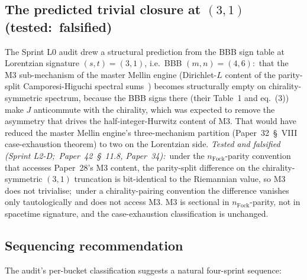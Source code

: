 \documentclass[twocolumn,pra,amsmath,amssymb,superscriptaddress]{revtex4-2}
\begin{document}
\subsection{The predicted trivial closure at $(3, 1)$ (tested:\ falsified)}
\label{sec:sig_trivial_closure}

The Sprint L0 audit drew a structural prediction from the BBB sign
table at Lorentzian signature $(s, t) = (3, 1)$, i.e.\ BBB
$(m, n) = (4, 6)$:\ that the M3 sub-mechanism of the master Mellin
engine (Dirichlet-$L$ content of the parity-split
Camporesi-Higuchi spectral sums~\cite{paper28}) becomes structurally
empty on chirality-symmetric spectrum, because the BBB signs there
(their Table~1 and eq.~(3)) make $J$ anticommute with the chirality,
which was expected to remove the asymmetry that drives the
half-integer-Hurwitz content of M3.  That would have reduced the master
Mellin engine's three-mechanism partition (Paper~32~\S~VIII
case-exhaustion theorem) to two on the Lorentzian side.  \emph{Tested
and falsified (Sprint L2-D;\ Paper~42~\S~11.8, Paper~34):}\ under the
$n_{\mathrm{Fock}}$-parity convention that accesses Paper~28's M3
content, the parity-split difference on the chirality-symmetric
$(3, 1)$ truncation is bit-identical to the Riemannian value, so M3
does not trivialise;\ under a chirality-pairing convention the
difference vanishes only tautologically and does not access M3.  M3 is
sectional in $n_{\mathrm{Fock}}$-parity, not in spacetime signature,
and the case-exhaustion classification is unchanged.

\subsection{Sequencing recommendation}
\label{sec:sig_sequencing}

The audit's per-bucket classification suggests a natural four-sprint
sequence:
\end{document}
